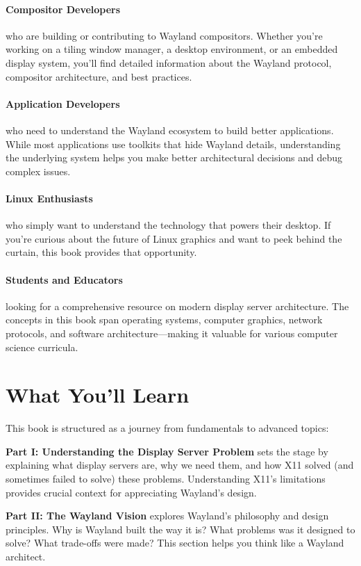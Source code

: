 \paragraph{Compositor Developers} who are building or contributing to Wayland compositors. Whether you're working on a tiling window manager, a desktop environment, or an embedded display system, you'll find detailed information about the Wayland protocol, compositor architecture, and best practices.

\paragraph{Application Developers} who need to understand the Wayland ecosystem to build better applications. While most applications use toolkits that hide Wayland details, understanding the underlying system helps you make better architectural decisions and debug complex issues.

\paragraph{Linux Enthusiasts} who simply want to understand the technology that powers their desktop. If you're curious about the future of Linux graphics and want to peek behind the curtain, this book provides that opportunity.

\paragraph{Students and Educators} looking for a comprehensive resource on modern display server architecture. The concepts in this book span operating systems, computer graphics, network protocols, and software architecture—making it valuable for various computer science curricula.

\section*{What You'll Learn}

This book is structured as a journey from fundamentals to advanced topics:

\textbf{Part I: Understanding the Display Server Problem} sets the stage by explaining what display servers are, why we need them, and how X11 solved (and sometimes failed to solve) these problems. Understanding X11's limitations provides crucial context for appreciating Wayland's design.

\textbf{Part II: The Wayland Vision} explores Wayland's philosophy and design principles. Why is Wayland built the way it is? What problems was it designed to solve? What trade-offs were made? This section helps you think like a Wayland architect.

